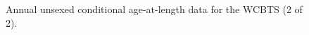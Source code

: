 \documentclass[
]{scrartcl}
\begin{document}
\begin{figure}


\caption{\label{fig-NWFSC_agecomps2}Annual unsexed conditional
age-at-length data for the WCBTS (2 of 2).}

\end{figure}%
\end{document}
